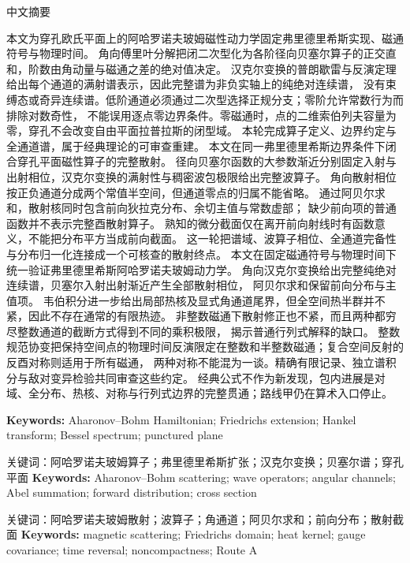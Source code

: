 \documentclass[10pt]{article}
\begin{document}
\begin{center}{\cjkfont 中文摘要}\end{center}
{\cjkfont\small\raggedright
\ifcase\CRevisionRound
本文为穿孔欧氏平面上的阿哈罗诺夫玻姆磁性动力学固定弗里德里希斯实现、磁通符号与物理时间。
角向傅里叶分解把闭二次型化为各阶径向贝塞尔算子的正交直和，阶数由角动量与磁通之差的绝对值决定。
汉克尔变换的普朗歇雷与反演定理给出每个通道的满射谱表示，因此完整谱为非负实轴上的纯绝对连续谱，
没有束缚态或奇异连续谱。低阶通道必须通过二次型选择正规分支；零阶允许常数行为而排除对数奇性，
不能误用逐点零边界条件。零磁通时，点的二维索伯列夫容量为零，穿孔不会改变自由平面拉普拉斯的闭型域。
本轮完成算子定义、边界约定与全通道谱，属于经典理论的可审查重建。
\or
本文在同一弗里德里希斯边界条件下闭合穿孔平面磁性算子的完整散射。
径向贝塞尔函数的大参数渐近分别固定入射与出射相位，汉克尔变换的满射性与稠密波包极限给出完整波算子。
角向散射相位按正负通道分成两个常值半空间，但通道零点的归属不能省略。
通过阿贝尔求和，散射核同时包含前向狄拉克分布、余切主值与常数虚部；
缺少前向项的普通函数并不表示完整酉散射算子。
熟知的微分截面仅在离开前向射线时有函数意义，不能把分布平方当成前向截面。
这一轮把谱域、波算子相位、全通道完备性与分布归一化连接成一个可核查的散射终点。
\else
本文在固定磁通符号与物理时间下统一验证弗里德里希斯阿哈罗诺夫玻姆动力学。
角向汉克尔变换给出完整纯绝对连续谱，贝塞尔入射出射渐近产生全部散射相位，
阿贝尔求和保留前向分布与主值项。
韦伯积分进一步给出局部热核及显式角通道尾界，但全空间热半群并不紧，因此不存在通常的有限热迹。
非整数磁通下散射修正也不紧，而且两种都穷尽整数通道的截断方式得到不同的乘积极限，
揭示普通行列式解释的缺口。
整数规范协变把保持空间点的物理时间反演限定在整数和半整数磁通；复合空间反射的反酉对称则适用于所有磁通，
两种对称不能混为一谈。精确有限记录、独立谱积分与敌对变异检验共同审查这些约定。
经典公式不作为新发现，包内进展是对域、全分布、热核、对称与行列式边界的完整贯通；路线甲仍在算术入口停止。
\fi\par}
\medskip
\ifcase\CRevisionRound
\noindent\textbf{Keywords:} Aharonov--Bohm Hamiltonian; Friedrichs extension; Hankel transform; Bessel spectrum; punctured plane

{\cjkfont\noindent 关键词：阿哈罗诺夫玻姆算子；弗里德里希斯扩张；汉克尔变换；贝塞尔谱；穿孔平面}
\or
\noindent\textbf{Keywords:} Aharonov--Bohm scattering; wave operators; angular channels; Abel summation; forward distribution; cross section

{\cjkfont\noindent 关键词：阿哈罗诺夫玻姆散射；波算子；角通道；阿贝尔求和；前向分布；散射截面}
\else
\noindent\textbf{Keywords:} magnetic scattering; Friedrichs domain; heat kernel; gauge covariance; time reversal; noncompactness; Route A
\end{document}
